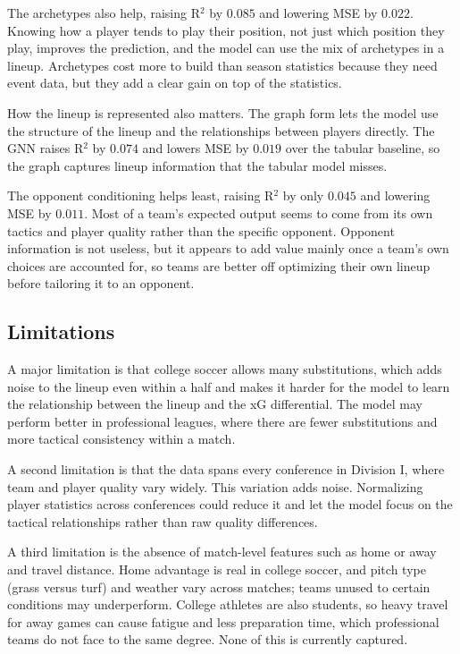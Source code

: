 \documentclass[11pt,twocolumn]{article}
\begin{document}
The archetypes also help, raising R$^2$ by $0.085$ and lowering MSE by
$0.022$. Knowing how a player tends to play their position, not just
which position they play, improves the prediction, and the model can use
the mix of archetypes in a lineup. Archetypes cost more to build than
season statistics because they need event data, but they add a clear gain
on top of the statistics.

How the lineup is represented also matters. The graph form lets the model
use the structure of the lineup and the relationships between players
directly. The GNN raises R$^2$ by $0.074$ and lowers MSE by $0.019$ over
the tabular baseline, so the graph captures lineup information that the
tabular model misses.

The opponent conditioning helps least, raising R$^2$ by only $0.045$ and
lowering MSE by $0.011$. Most of a team's expected output seems to come
from its own tactics and player quality rather than the specific
opponent. Opponent information is not useless, but it appears to add value
mainly once a team's own choices are accounted for, so teams are better
off optimizing their own lineup before tailoring it to an opponent.

\subsection{Limitations}

A major limitation is that college soccer allows many substitutions,
which adds noise to the lineup even within a half and makes it harder for
the model to learn the relationship between the lineup and the xG
differential. The model may perform better in professional leagues, where
there are fewer substitutions and more tactical consistency within a
match.

A second limitation is that the data spans every conference in Division I,
where team and player quality vary widely. This variation adds noise.
Normalizing player statistics across conferences could reduce it and let
the model focus on the tactical relationships rather than raw quality
differences.

A third limitation is the absence of match-level features such as home or
away and travel distance. Home advantage is real in college soccer, and
pitch type (grass versus turf) and weather vary across matches; teams
unused to certain conditions may underperform. College athletes are also
students, so heavy travel for away games can cause fatigue and less
preparation time, which professional teams do not face to the same
degree. None of this is currently captured.
\end{document}
